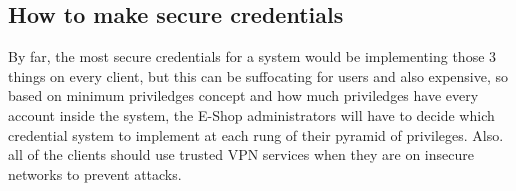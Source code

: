 \documentclass[10pt,a4paper]{article} %
\begin{document}
        \subsection{How to make secure credentials}
            By far, the most secure credentials for a system would be
            implementing those 3 things on every client, but this can be
            suffocating for users and also expensive, so based on minimum
            priviledges concept and how much priviledges have every account
            inside the system, the E-Shop administrators will have to decide
            which credential system to implement at each rung of their pyramid
            of privileges. Also. all of the clients should use trusted VPN
            services when they are on insecure networks to prevent attacks.
        

        
        

    
    \nocite{*}
    
    
\end{document}
